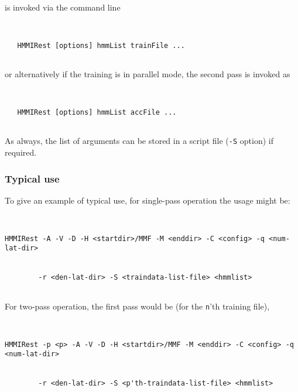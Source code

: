  \label{sec:hmmirestuse}





 is invoked via the command line


\begin{verbatim}


   HMMIRest [options] hmmList trainFile ...


\end{verbatim}


or alternatively if the training is in parallel mode, the second pass is invoked as


\begin{verbatim}


   HMMIRest [options] hmmList accFile ...


\end{verbatim}





As always, the list of arguments can be stored in a script file (\texttt{-S} option) if required.  





\subsubsection{Typical use}





To give an example of typical use, for single-pass operation the usage might be:


\begin{verbatim}


HMMIRest -A -V -D -H <startdir>/MMF -M <enddir> -C <config> -q <num-lat-dir> 


        -r <den-lat-dir> -S <traindata-list-file> <hmmlist>


\end{verbatim}


For two-pass operation, the first pass would be (for the \texttt{n}'th training file),


\begin{verbatim}


HMMIRest -p <p> -A -V -D -H <startdir>/MMF -M <enddir> -C <config> -q <num-lat-dir>


        -r <den-lat-dir> -S <p'th-traindata-list-file> <hmmlist>


\end{verbatim}


